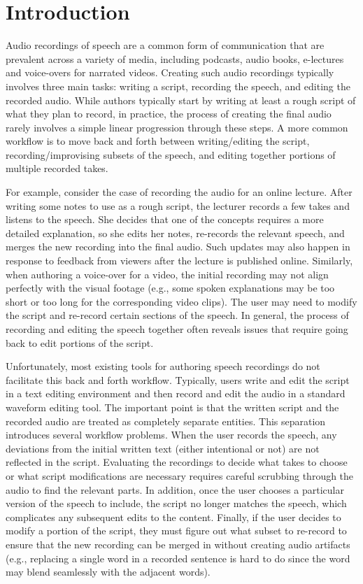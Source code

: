 \section{Introduction}

Audio recordings of speech are a common form of communication that are prevalent across a variety of media, including podcasts, audio books, e-lectures and voice-overs for narrated videos.
%
Creating such audio recordings typically involves three main tasks: writing a script, recording the speech, and editing the recorded audio. 
%
While authors typically start by writing at least a rough script of what they plan to record, in practice, the process of creating the final audio rarely involves a simple linear progression through these steps. A more common workflow is to move back and forth between writing/editing the script, recording/improvising subsets of the speech, and editing together portions of multiple recorded takes.

For example, consider the case of recording the audio for an online lecture. After writing some notes to use as a rough script, the lecturer records a few takes and listens to the speech. She decides that one of the concepts requires a more detailed explanation, so she edits her notes, re-records the relevant speech, and merges the new recording into the final audio. Such updates may also happen in response to feedback from viewers after the lecture is published online. Similarly, when authoring a voice-over for a video, the initial recording may not align perfectly with the visual footage (e.g., some spoken explanations may be too short or too long for the corresponding video clips). The user may need to modify the script and re-record certain sections of the speech. In general, the process of recording and editing the speech together often reveals issues that require going back to edit portions of the script.

Unfortunately, most existing tools for authoring speech recordings do not facilitate this back and forth workflow. Typically, users write and edit the script in a text editing environment and then record and edit the audio in a standard waveform editing tool. The important point is that the written script and the recorded audio are treated as completely separate entities.
%
This separation introduces several workflow problems. When the user records the speech, any deviations from the initial written text (either intentional or not) are not reflected in the script. Evaluating the recordings to decide what takes to choose or what script modifications are necessary requires careful scrubbing through the audio to find the relevant parts. In addition, once the user chooses a particular version of the speech to include, the script no longer matches the speech, which complicates any subsequent edits to the content. Finally, if the user decides to modify a portion of the script, they must figure out what subset to re-record to ensure that the new recording can be merged in without creating audio artifacts (e.g., replacing a single word in a recorded sentence is hard to do since the word may blend seamlessly with the adjacent words).

